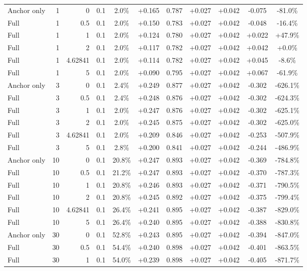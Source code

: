 \begin{table}[htbp]
\begin{tabular}{lrrrccccccc}
Anchor only & 1 & 0 & 0.1 & 2.0\% & +0.165 & 0.787 & +0.027 & +0.042 & -0.075 & -81.0\% \\
Full & 1 & 0.5 & 0.1 & 2.0\% & +0.150 & 0.783 & +0.027 & +0.042 & -0.048 & -16.4\% \\
Full & 1 & 1 & 0.1 & 2.0\% & +0.124 & 0.780 & +0.027 & +0.042 & +0.022 & +47.9\% \\
Full & 1 & 2 & 0.1 & 2.0\% & +0.117 & 0.782 & +0.027 & +0.042 & +0.042 & +0.0\% \\
Full & 1 & 4.62841 & 0.1 & 2.0\% & +0.114 & 0.782 & +0.027 & +0.042 & +0.045 & -8.6\% \\
Full & 1 & 5 & 0.1 & 2.0\% & +0.090 & 0.795 & +0.027 & +0.042 & +0.067 & -61.9\% \\
Anchor only & 3 & 0 & 0.1 & 2.4\% & +0.249 & 0.877 & +0.027 & +0.042 & -0.302 & -626.1\% \\
Full & 3 & 0.5 & 0.1 & 2.4\% & +0.248 & 0.876 & +0.027 & +0.042 & -0.302 & -624.3\% \\
Full & 3 & 1 & 0.1 & 2.0\% & +0.247 & 0.876 & +0.027 & +0.042 & -0.302 & -625.1\% \\
Full & 3 & 2 & 0.1 & 2.0\% & +0.245 & 0.875 & +0.027 & +0.042 & -0.302 & -625.0\% \\
Full & 3 & 4.62841 & 0.1 & 2.0\% & +0.209 & 0.846 & +0.027 & +0.042 & -0.253 & -507.9\% \\
Full & 3 & 5 & 0.1 & 2.8\% & +0.200 & 0.841 & +0.027 & +0.042 & -0.244 & -486.9\% \\
Anchor only & 10 & 0 & 0.1 & 20.8\% & +0.247 & 0.893 & +0.027 & +0.042 & -0.369 & -784.8\% \\
Full & 10 & 0.5 & 0.1 & 21.2\% & +0.247 & 0.893 & +0.027 & +0.042 & -0.370 & -787.3\% \\
Full & 10 & 1 & 0.1 & 20.8\% & +0.246 & 0.893 & +0.027 & +0.042 & -0.371 & -790.5\% \\
Full & 10 & 2 & 0.1 & 20.8\% & +0.245 & 0.892 & +0.027 & +0.042 & -0.375 & -799.4\% \\
Full & 10 & 4.62841 & 0.1 & 26.4\% & +0.241 & 0.895 & +0.027 & +0.042 & -0.387 & -829.0\% \\
Full & 10 & 5 & 0.1 & 26.4\% & +0.240 & 0.895 & +0.027 & +0.042 & -0.388 & -830.8\% \\
Anchor only & 30 & 0 & 0.1 & 52.8\% & +0.243 & 0.895 & +0.027 & +0.042 & -0.394 & -847.0\% \\
Full & 30 & 0.5 & 0.1 & 54.4\% & +0.240 & 0.898 & +0.027 & +0.042 & -0.401 & -863.5\% \\
Full & 30 & 1 & 0.1 & 54.0\% & +0.239 & 0.898 & +0.027 & +0.042 & -0.405 & -871.7\% \\

\end{tabular}
\end{table}
